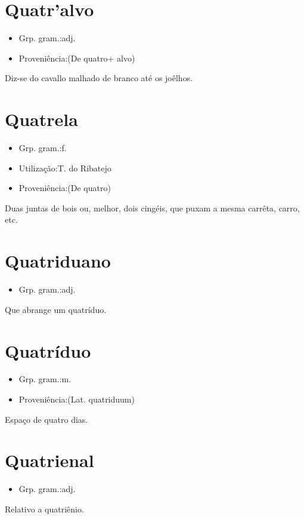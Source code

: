\section{Quatr'alvo}
\begin{itemize}
\item {Grp. gram.:adj.}
\end{itemize}
\begin{itemize}
\item {Proveniência:(De \textunderscore quatro\textunderscore  + \textunderscore alvo\textunderscore )}
\end{itemize}
Diz-se do cavallo malhado de branco até os joêlhos.
\section{Quatrela}
\begin{itemize}
\item {Grp. gram.:f.}
\end{itemize}
\begin{itemize}
\item {Utilização:T. do Ribatejo}
\end{itemize}
\begin{itemize}
\item {Proveniência:(De \textunderscore quatro\textunderscore )}
\end{itemize}
Duas juntas de bois \textunderscore ou\textunderscore , melhor, dois cingéis, que puxam a mesma carrêta, carro, etc.
\section{Quatriduano}
\begin{itemize}
\item {Grp. gram.:adj.}
\end{itemize}
Que abrange um quatríduo.
\section{Quatríduo}
\begin{itemize}
\item {Grp. gram.:m.}
\end{itemize}
\begin{itemize}
\item {Proveniência:(Lat. \textunderscore quatriduum\textunderscore )}
\end{itemize}
Espaço de quatro dias.
\section{Quatrienal}
\begin{itemize}
\item {Grp. gram.:adj.}
\end{itemize}
Relativo a quatriênio.
